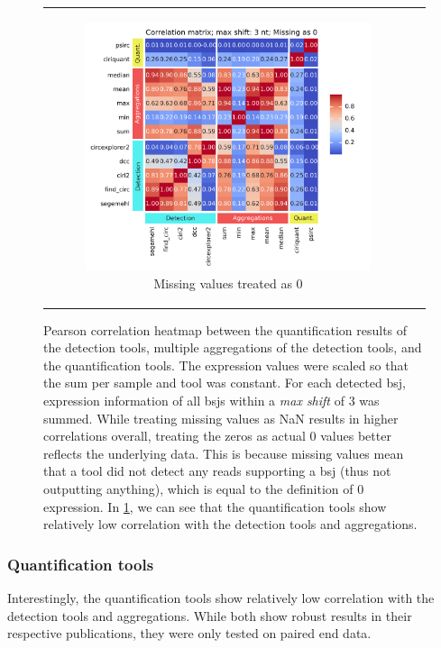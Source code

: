 \begin{figure}[ht]
\begin{tabular}{cc}
\begin{subfigure}{0.5\textwidth}
            \includegraphics[width=\linewidth]{chapters/4_results_and_discussion/figures/quantification/correlation_heatmap_3_0.png}
            \caption{Missing values treated as 0}
            \label{fig:correlation_heatmap_3_0}
        \end{subfigure} \end{tabular} \caption{Pearson correlation heatmap
        between the
        quantification results of the detection tools, multiple aggregations of
        the
        detection tools, and the quantification tools.
        The expression values were scaled so that the sum per sample and tool was
        constant.
        For each detected \gls{bsj}, expression information of all \gls{bsj}s within a
        \textit{max shift} of 3 was summed.
        While treating missing values as NaN results in higher correlations overall,
        treating the zeros as actual 0 values better reflects the underlying data.
        This is because missing values mean that a tool did not detect any reads
        supporting a \gls{bsj} (thus not outputting anything), which is equal to the
        definition of 0 expression.
        In \cref{fig:correlation_heatmap_3_0}, we can see that the quantification tools
        show relatively low correlation with the detection tools and aggregations.
    } \label{fig:correlation_heatmap} \end{figure}

\subsubsection{Quantification tools}
Interestingly, the quantification tools show relatively low correlation with
the detection tools and aggregations.
While both show robust results in their respective publications, they were only
tested on paired end data\supercite{zhang_accurate_2020,yu_quantifying_2021}.

